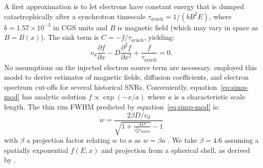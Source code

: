 \documentclass[iop, apj, numberedappendix]{emulateapj}
\newcommand*{\mt}{\mathrm}
\newcommand*{\ptl}{\partial}
\newcommand*{\tsynch}{\tau_{\mt{synch}}}
\begin{document}
A first approximation is to let electrons have constant energy that is dumped
catastrophically after a synchrotron timescale $\tsynch = 1/(b B^2 E)$, where
$b = 1.57 \times 10^{-3}$ in CGS units and $B$ is magnetic field (which may
vary in space as $B=B(x)$).  The sink term is $C = -f / \tsynch$, yielding:
\begin{equation} \label{eq:simp-mod}
    v_d \frac{\ptl f}{\ptl x} - D \frac{\ptl^2 f}{\ptl x^2} +
    \frac{f}{\tau_{\mt{synch}}} = 0 .
\end{equation}
No assumptions on the injected electron source term are necessary.
\citet{parizot2006} employed this model to derive estimates of magnetic fields,
diffusion coefficients, and electron spectrum cut-offs for several historical
SNRs.  Conveniently, equation~\eqref{eq:simp-mod} has analytic solution $f
\propto \exp(-x/a)$ where $a$ is a characteristic scale length.  The thin rim
FWHM predicted by equation~\eqref{eq:simp-mod} is:
\begin{equation} \label{eq:simp-fwhm}
    w = \frac{2\beta D / v_d}{\sqrt{1 +\frac{4D}{v_d^2 \tsynch}} - 1}
\end{equation}
with $\beta$ a projection factor relating $w$ to $a$ as $w = \beta a$
\citep{berezhko2004, parizot2006}.  We take $\beta = 4.6$ assuming a spatially
exponential $f(E,x)$ and projection from a spherical shell, as derived by
\citet{ballet2006}.
\end{document}
